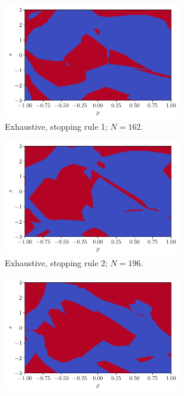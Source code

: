 \documentclass[a4paper, 12pt]{article}
\begin{document}
    \begin{figure}[H]
        \centering
        \begin{subfigure}{0.49\textwidth}
            \centering
            \includegraphics[width=0.85\textwidth]{resources/pdf/4_exhaustive_1_MLP_mu.pdf}
            \caption{Exhaustive, stopping rule 1; $N = 162$.}
            \vspace{0.5em}
        \end{subfigure}
        \hfill
        \begin{subfigure}{0.49\textwidth}
            \centering
            \includegraphics[width=0.85\textwidth]{resources/pdf/4_exhaustive_2_MLP_mu.pdf}
            \caption{Exhaustive, stopping rule 2; $N = 196$.}
            \vspace{0.5em}
        \end{subfigure}
        \begin{subfigure}{0.49\textwidth}
            \centering
            \includegraphics[width=0.85\textwidth]{resources/pdf/4_montecarlo_1_MLP_mu.pdf}

\end{subfigure}
\end{figure}
\end{document}
